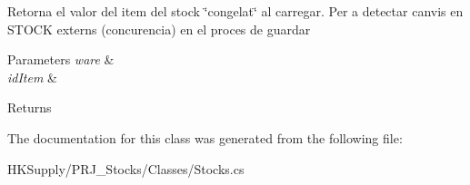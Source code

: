 Retorna el valor del item del stock \char`\"{}congelat\char`\"{} al carregar. Per a detectar canvis en S\+T\+O\+CK externs (concurencia) en el proces de guardar 


\begin{DoxyParams}{Parameters}
{\em ware} & \\
\hline
{\em id\+Item} & \\
\hline
\end{DoxyParams}
\begin{DoxyReturn}{Returns}

\end{DoxyReturn}


The documentation for this class was generated from the following file\+:\begin{DoxyCompactItemize}
\item 
H\+K\+Supply/\+P\+R\+J\+\_\+\+Stocks/\+Classes/Stocks.\+cs\end{DoxyCompactItemize}
